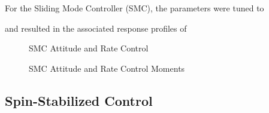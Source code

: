 For the Sliding Mode Controller (SMC), the parameters were tuned to


and resulted in the associated response profiles of
\begin{figure}[H]
  \centerline{}
  \caption{SMC Attitude and Rate Control}
  \label{fig:SMCAttitudeAndRateControl}
\end{figure}
\begin{figure}[H]
  \centerline{}
  \caption{SMC Attitude and Rate Control Moments}
  \label{fig:SMCAttitudeAndRateControlMoments}
\end{figure}

\subsection{Spin-Stabilized Control}
\label{subsec:SpinStabilizedControl}















